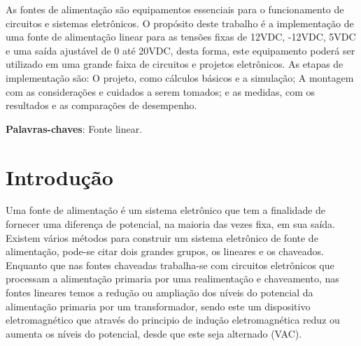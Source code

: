 \documentclass[
	article,			%
	11pt,				%
	oneside,			%
	a4paper,			%
	english,			%
	brazil,				%
	sumario=tradicional
	]{abntex2}
\begin{document}
\frenchspacing 


%
%
\maketitle

\begin{resumoumacoluna}
 As fontes de alimentação são equipamentos essenciais para o funcionamento de circuitos e sistemas eletrônicos. O propósito deste trabalho é a implementação de uma fonte de alimentação linear para as tensões fixas de 12VDC, -12VDC, 5VDC e uma saída ajustável de 0 até 20VDC, desta forma, este equipamento poderá ser utilizado em uma grande faixa de circuitos e projetos eletrônicos. As etapas de implementação são: O projeto, como cálculos básicos e a simulação; A montagem com as considerações e cuidados a serem tomados; e as medidas, com os resultados e as comparações de desempenho. 
 
 \vspace{\onelineskip}
 
 \noindent
 \textbf{Palavras-chaves}: Fonte linear.
\end{resumoumacoluna}


\textual
\section*{Introdução}

  Uma fonte de alimentação é um sistema eletrônico que tem a finalidade de fornecer uma diferença de potencial, na maioria das vezes fixa, em sua saída.%
Existem vários métodos para construir um sistema eletrônico de fonte de alimentação, pode-se citar dois grandes grupos, os lineares e os chaveados. Enquanto que nas fontes chaveadas trabalha-se com circuitos eletrônicos que processam a alimentação primaria por uma realimentação e chaveamento, nas fontes lineares temos a redução ou ampliação dos níveis do potencial da alimentação primaria por um transformador, sendo este um dispositivo eletromagnético que através do principio de indução eletromagnética reduz ou aumenta os níveis do potencial, desde que este seja alternado (VAC).
\end{document}
